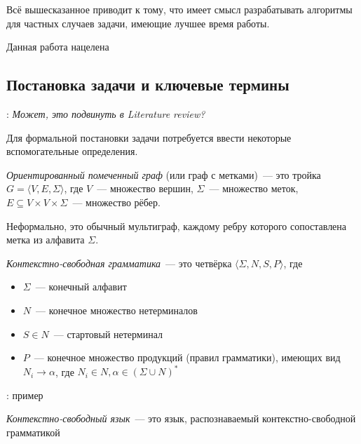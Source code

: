  Всё вышесказанное приводит к тому, что имеет смысл разрабатывать алгоритмы для частных случаев задачи, имеющие лучшее время работы. 

 Данная работа нацелена 

\subsection*{Постановка задачи и ключевые термины}

\TODO: \textit{Может, это подвинуть в Literature review?}

Для формальной постановки задачи потребуется ввести некоторые вспомогательные определения.

\begin{definition}
    \textit{Ориентированный помеченный граф} (или граф с метками)~--- это тройка $G = \langle V, E, \Sigma \rangle$, где $V$~--- множество вершин, $\Sigma$~--- множество меток, $E \subseteq V \times V \times \Sigma$~--- множество рёбер. 

    Неформально, это обычный мультиграф, каждому ребру которого сопоставлена метка из алфавита $\Sigma$.
\end{definition}

\begin{definition}
\textit{Контекстно-свободная грамматика}~--- это четвёрка $\langle \Sigma, N, S, P \rangle$, где
\begin{itemize}
    \item $\Sigma$~--- конечный алфавит
    \item $N$~--- конечное множество нетерминалов
    \item $S \in N$~--- стартовый нетерминал
    \item $P$~--- конечное множество продукций (правил грамматики), имеющих вид\\ $N_i \to \alpha$, где $N_i \in N, \alpha \in (\Sigma \cup N)^{*}$
\end{itemize}
\end{definition}

\begin{example}
\TODO: пример
\end{example}


\begin{definition}
\textit{Контекстно-свободный язык}~--- это язык, распознаваемый контекстно-свободной грамматикой

\end{definition}

